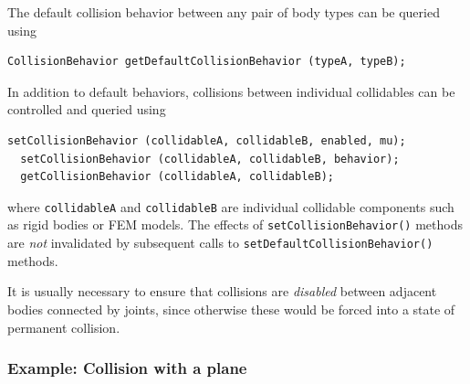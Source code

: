 The default collision behavior between any pair of body types can
be queried using
%
\begin{lstlisting}[]
  CollisionBehavior getDefaultCollisionBehavior (typeA, typeB);
\end{lstlisting}
%

In addition to default behaviors, collisions between individual
collidables can be controlled and queried using
%
\begin{lstlisting}[]
  setCollisionBehavior (collidableA, collidableB, enabled, mu);
  setCollisionBehavior (collidableA, collidableB, behavior);
  getCollisionBehavior (collidableA, collidableB);
\end{lstlisting}
%
where {\tt collidableA} and {\tt collidableB} are individual
collidable components such as rigid bodies or FEM models.  The effects
of {\tt setCollisionBehavior()} methods are {\it not} invalidated by
subsequent calls to {\tt setDefaultCollisionBehavior()} methods.

\begin{sideblock}
It is usually necessary to ensure that collisions are {\it disabled}
between adjacent bodies connected by joints, since otherwise these
would be forced into a state of permanent collision.
\end{sideblock}

\subsubsection{Example: Collision with a plane}

